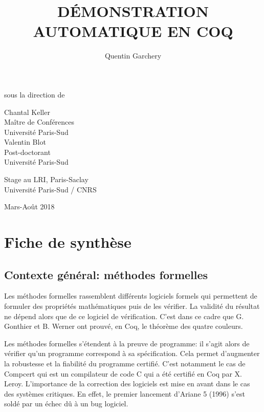 \documentclass[11pt]{article}
\title{ {\Large \textbf{DÉMONSTRATION AUTOMATIQUE EN COQ}} }
\date{}
\author{Quentin Garchery}
\begin{document}
\maketitle
\thispagestyle{empty}

\begin{center}
\normalsize sous la direction de \\

\vspace{3mm}

\begin{multicols}{2}
\large Chantal Keller \\
Maître de Conférences\\
Université Paris-Sud \\

\large Valentin Blot \\
Post-doctorant\\
Université Paris-Sud
\end{multicols}

\vspace{7mm}

\Large{Stage au LRI, Paris-Saclay\\
Université Paris-Sud / CNRS \\}

\vspace{5mm}

\normalsize Mars-Août 2018

\end{center}


\vspace{2cm}


\section{Fiche de synthèse}

\subsection{Contexte général: méthodes formelles}

Les méthodes formelles rassemblent différents logiciels formels qui permettent de formuler des propriétés mathématiques puis de les vérifier. La validité du résultat ne dépend alors que de ce logiciel de vérification. C'est dans ce cadre que G. Gonthier et B. Werner ont prouvé, en Coq, le théorème des quatre couleurs.\medbreak

Les méthodes formelles s'étendent à la preuve de programme: il s'agit alors de vérifier qu'un programme correspond à sa spécification. Cela permet d'augmenter la robustesse et la fiabilité du programme certifié. C'est notamment le cas de Compcert \cite{compcert} qui est un compilateur de code C qui a été certifié en Coq par X. Leroy. L'importance de la correction des logiciels est mise en avant dans le cas des systèmes critiques. En effet, le premier lancement d'Ariane 5 (1996) s'est soldé par un échec dû à un bug logiciel. 
\end{document}
